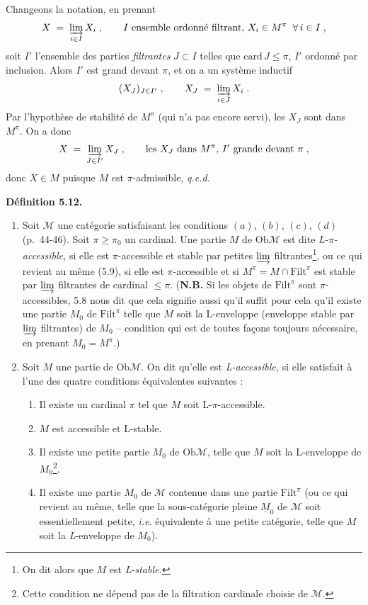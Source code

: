 \documentclass[11pt]{article}
\newcommand{\msp}[1]{\marginpar{\footnotesize [#1]}}
\newcommand{\Filt}{\mathrm{Filt}}
\newcommand{\Ob}{\mathrm{Ob}}
\newcommand{\M}{\mathcal{M}}
\begin{document}
Changeons la notation, en prenant
\[
X \;=\; \varinjlim_{i \in I} X_i \;, \qquad I \text{ ensemble ordonné filtrant, } X_i \in M^\pi \;\; \forall\, i \in I \;,
\]
soit $I'$ l'ensemble des parties \textit{filtrantes} $J \subset I$ telles que $\mathrm{card}\, J \leq \pi$, $I'$ ordonné par inclusion. Alors $I'$ est grand devant $\pi$, et on a un système inductif
\[
(X_J)_{J \in I'} \;, \qquad X_J \;=\; \varinjlim_{i \in J} X_i \;.
\]
Par l'hypothèse de stabilité de $M^\pi$ (qui n'a pas encore servi), les $X_J$ sont dans $M^\pi$. On a donc
\[
X \;=\; \varinjlim_{J \in I'} X_J \;, \qquad \text{les } X_J \text{ dans } M^\pi\text{, } I' \text{ grande devant } \pi \;,
\]
donc $X \in M$ puisque $M$ est $\pi$-admissible, \quad \textit{q.e.d.}

\msp{page 66}

\textbf{Définition 5.12.}
\begin{enumerate}[label={}]
\item[1)] Soit $\M$ une catégorie satisfaisant les conditions $(a)$, $(b)$, $(c)$, $(d)$ (p.~44-46). Soit $\pi \geq \pi_0$ un cardinal. Une partie $M$ de $\Ob\M$ est dite \textit{L-$\pi$-accessible,} si elle est $\pi$-accessible et stable par petites $\varinjlim$ filtrantes\footnote[24]{On dit alors que $M$ est \textit{L-stable.}}, ou ce qui revient au même (5.9), si elle est $\pi$-accessible et si $M^\pi = M \cap \Filt^\pi$ est stable par $\varinjlim$ filtrantes de cardinal $\leq \pi$. (\textbf{N.B.} Si les objets de $\Filt^\pi$ sont $\pi$-accessibles, 5.8 nous dit que cela signifie aussi qu'il suffit pour cela qu'il existe une partie $M_0$ de $\Filt^\pi$ telle que $M$ soit la L-enveloppe (enveloppe stable par $\varinjlim$ filtrantes) de $M_0$ -- condition qui est de toutes façons toujours nécessaire, en prenant $M_0 = M^\pi$.)
\item[2)] Soit $M$ une partie de $\Ob\M$. On dit qu'elle est \textit{L-accessible,} si elle satisfait à l'une des quatre conditions équivalentes suivantes :
\begin{enumerate}[label={}]
\item[\textit{a})] Il existe un cardinal $\pi$ tel que $M$ soit L-$\pi$-accessible.
\item[\textit{a}$'$)] $M$ est accessible et L-stable.
\item[\textit{b})] Il existe une petite partie $M_0$ de $\Ob\M$, telle que $M$ soit la L-enveloppe de $M_0$\footnote[25]{Cette condition ne dépend pas de la filtration cardinale choisie de $\M$.}.
\item[\textit{b}$'$)] Il existe une partie $M_0$ de $\M$ contenue dans une partie $\Filt^\pi$ (ou ce qui revient au même, telle que la sous-catégorie pleine $\underline{M}_0$ de $\M$ soit essentiellement petite, \textit{i.e.} équivalente à une petite catégorie, telle que $M$ soit la \textit{L}-enveloppe de $M_0$).
\end{enumerate}
\end{enumerate}
\end{document}
